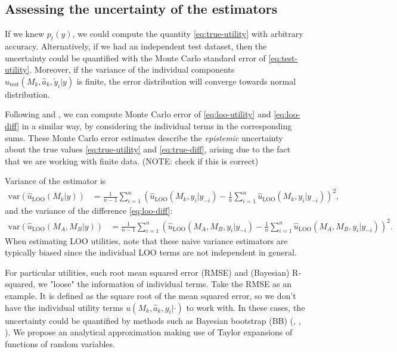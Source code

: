 \documentclass{article}
\begin{document}
\subsection{Assessing the uncertainty of the estimators}
If we knew $p_t(y)$, we could compute the quantity \eqref{eq:true-utility} with arbitrary accuracy. Alternatively, if we had an independent test dataset, then the uncertainty could be quantified with the Monte Carlo standard error of \eqref{eq:test-utility}. Moreover, if the variance of the individual components $\hat{u}_{\text{test}}(M_k, \hat{a}_k, \tilde{y}_i | y)$ is finite, the error distribution will converge towards normal distribution. 

Following \cite{vehtari_practical_2016} and \cite{sivula_uncertainty_2022}, we can compute Monte Carlo error of \eqref{eq:loo-utility} and \eqref{eq:loo-diff} in a similar way, by considering the individual terms in the corresponding sums. These Monte Carlo error estimates describe the \textit{epistemic} uncertainty about the true values \eqref{eq:true-utility} and \eqref{eq:true-diff}, arising due to the fact that we are working with finite data. (NOTE: check if this is correct)

Variance of the estimator is
\begin{align}
    \text{var} \left( \hat{u}_{\text{LOO}}(M_k | y) \right)  &= \frac{1}{n-1} \sum_{i = 1}^n \left( \hat{u}_{\text{LOO}}(M_k, y_i | y_{-i}) -  \frac{1}{n} \sum_{i=1}^n \hat{u}_{\text{LOO}}(M_k, y_i | y_{-i}) \right)^2, \label{eq:var-loo}
\end{align}
and the variance of the difference \eqref{eq:loo-diff}:
\begin{align}
    \text{var} \left( \hat{u}_{\text{LOO}}(M_A, M_B | y) \right) &= \frac{1}{n-1} \sum_{i = 1}^n \left( \hat{u}_{\text{LOO}}(M_A, M_B, y_i | y_{-i}) -  \frac{1}{n} \sum_{i=1}^n \hat{u}_{\text{LOO}}(M_A, M_B, y_i | y_{-i}) \right)^2. \label{eq:var-loo-diff}
\end{align}
When estimating LOO utilities, \cite{sivula_uncertainty_2022} note that these naive variance estimators are typically biased since the individual LOO terms are not independent in general.

For particular utilities, such root mean squared error (RMSE) and (Bayesian) R-squared, we "loose" the information of individual terms. Take the RMSE as an example. It is defined as the square root of the mean squared error, so we don't have the individual utility terms $u(M_k, \hat{a}_k, y_i | \cdot)$ to work with. In these cases, the uncertainty could be quantified by methods such as Bayesian bootstrap (BB) (\cite{rubin_bayesian_1981}, \cite{vehtari_bayesian_2002}, \cite{vehtari_survey_2012}). We propose an analytical approximation making use of Taylor expansions of functions of random variables. 
\end{document}

